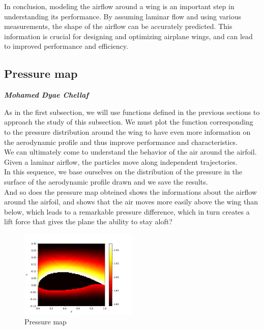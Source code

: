 In conclusion, modeling the airflow around a wing is an important step in understanding its performance. By assuming laminar flow and using various measurements, the shape of the airflow can be accurately predicted. This information is crucial for designing and optimizing airplane wings, and can lead to improved performance and efficiency.

\subsection{Pressure map}
\large \emph{\textbf{Mohamed Dyae Chellaf}}

As in the first subsection, we will use functions defined in the previous sections to approach the study of this subsection.
We must plot the function corresponding to the pressure distribution around the wing to have even more information on the aerodynamic profile and thus improve performance and characteristics.\\
We can ultimately come to understand the behavior of the air around the airfoil.\\
Given a laminar airflow, the particles move along independent trajectories.\\
In this sequence, we base ourselves on the distribution of the pressure in the surface of the aerodynamic profile drawn and we save the results.\\
And so does the pressure map obteined shows the informations about the airflow around the airfoil, and shows that the air moves more easily above the wing than below, which leads to a remarkable pressure difference, which in turn creates a lift force that gives the plane the ability to stay aloft?\\
\begin{figure}[H]
  \centering
  \includegraphics[width=0.5\textwidth]{img/pressure_map.png}
  \caption{Pressure map}
  \label{fig:pressure}
\end{figure}

